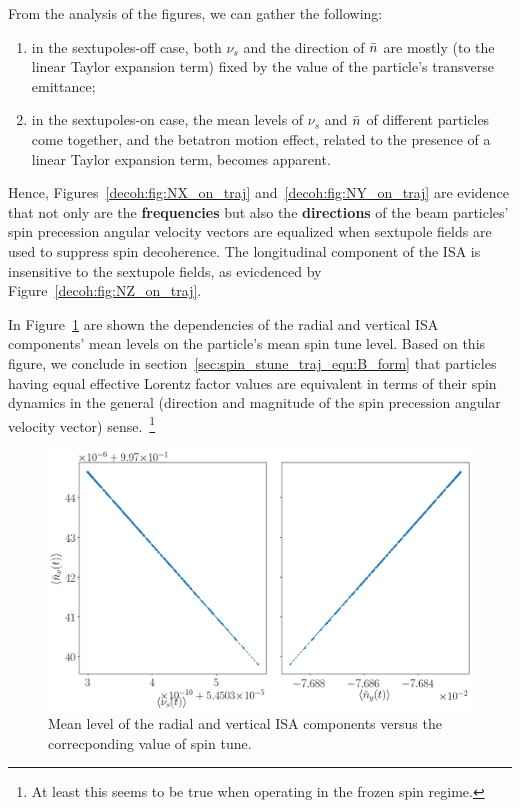 From the analysis of the figures, we can gather the following:
\begin{enumerate}
\item in the sextupoles-off case, both $\nu_s$ and the direction of $\bar n$ are mostly (to the
  linear Taylor expansion term) fixed by the value of the particle's transverse emittance;
\item in the sextupoles-on case, the mean levels of $\nu_s$ and $\bar n$ of different particles come
  together, and the betatron motion effect, related to the presence of a linear Taylor expansion term,
  becomes apparent.
\end{enumerate}
Hence, Figures~\ref{decoh:fig:NX_on_traj} and~\ref{decoh:fig:NY_on_traj} are evidence that not only are the
\textbf{frequencies} but also the \textbf{directions} of the beam particles' spin precession angular
velocity vectors are equalized when sextupole fields are used to suppress spin decoherence. The
longitudinal component of the ISA is insensitive to the sextupole fields, as evicdenced
by Figure~\ref{decoh:fig:NZ_on_traj}.

In Figure~\ref{decoh:fig:nbar_vs_ST} are shown the dependencies of the radial and vertical ISA components'
mean levels on the particle's mean spin tune level. Based on this figure, we conclude
in section~\ref{sec:spin_stune_traj_equ:B_form} that particles having equal effective Lorentz factor values
are equivalent in terms of their spin dynamics in the general (direction and magnitude of the spin precession
angular velocity vector) sense.~\footnote{At least this seems to be true when operating
  in the frozen spin regime.}
\begin{figure}[!h]
	\centering
	\includegraphics[width=\linewidth]{images/decoh_sim/mean_n_bar_vs_spin_tune}
	\caption{Mean level of the radial and vertical ISA components versus the correcponding
          value of spin tune.\label{decoh:fig:nbar_vs_ST}}
\end{figure}

